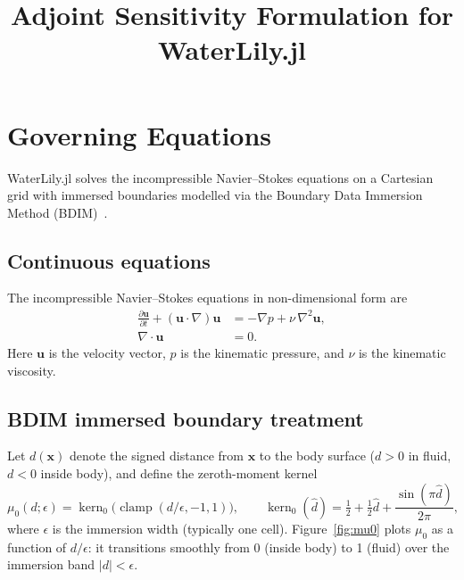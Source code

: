\documentclass[11pt]{article}
\title{Adjoint Sensitivity Formulation for WaterLily.jl}
\author{}
\date{}
\newcommand{\vect}[1]{\bm{#1}}
\newcommand{\pp}{\partial}
\begin{document}
\maketitle

\tableofcontents

\section{Governing Equations}

WaterLily.jl solves the incompressible Navier--Stokes equations on a
Cartesian grid with immersed boundaries modelled via the Boundary Data
Immersion Method (BDIM)~\cite{Maertens2015}.

\subsection{Continuous equations}

The incompressible Navier--Stokes equations in non-dimensional form are
\begin{align}
  \frac{\pp \vect{u}}{\pp t} + (\vect{u}\cdot\nabla)\vect{u}
    &= -\nabla p + \nu\,\nabla^{2}\vect{u}, \label{eq:momentum}\\
  \nabla\cdot\vect{u} &= 0. \label{eq:continuity}
\end{align}
Here $\vect{u}$ is the velocity vector, $p$ is the kinematic pressure, and
$\nu$ is the kinematic viscosity.

\subsection{BDIM immersed boundary treatment}

Let $d(\vect{x})$ denote the signed distance from $\vect{x}$ to the body
surface ($d>0$ in fluid, $d<0$ inside body), and define the zeroth-moment
kernel
\begin{equation}\label{eq:mu0}
  \mu_0(d;\epsilon) = \operatorname{kern}_0\!\bigl(\operatorname{clamp}(d/\epsilon, -1, 1)\bigr),
  \qquad
  \operatorname{kern}_0(\hat d) = \tfrac{1}{2} + \tfrac{1}{2}\hat d
    + \frac{\sin(\pi\hat d)}{2\pi},
\end{equation}
where $\epsilon$ is the immersion width (typically one cell).
Figure~\ref{fig:mu0} plots $\mu_0$ as a function of $d/\epsilon$: it
transitions smoothly from 0 (inside body) to 1 (fluid) over the
immersion band $|d|<\epsilon$.
\end{document}
